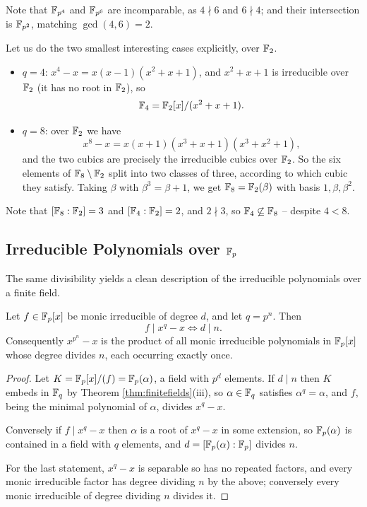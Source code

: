 \documentclass[a4paper]{scrartcl}
\begin{document}
Note that $\mathbb{F}_{p^4}$ and $\mathbb{F}_{p^6}$ are incomparable, as $4 \nmid 6$ and $6 \nmid 4$; and their intersection is $\mathbb{F}_{p^2}$, matching $\gcd(4,6) = 2$.

\begin{example}
	Let us do the two smallest interesting cases explicitly, over $\mathbb{F}_2$.
	\begin{itemize}
		\item $q = 4$: $x^4 - x = x(x-1)(x^2+x+1)$, and $x^2+x+1$ is irreducible over $\mathbb{F}_2$ (it has no root in $\mathbb{F}_2$), so
		$$\mathbb{F}_4 = \mathbb{F}_2[x]/(x^2+x+1).$$
		\item $q = 8$: over $\mathbb{F}_2$ we have
		$$x^8-x = x(x+1)(x^3+x+1)(x^3+x^2+1),$$
		and the two cubics are precisely the irreducible cubics over $\mathbb{F}_2$. So the six elements of $\mathbb{F}_8 \setminus \mathbb{F}_2$ split into two classes of three, according to which cubic they satisfy. Taking $\beta$ with $\beta^3 = \beta + 1$, we get $\mathbb{F}_8 = \mathbb{F}_2(\beta)$ with basis $1, \beta, \beta^2$.
	\end{itemize}
	Note that $[\mathbb{F}_8:\mathbb{F}_2] = 3$ and $[\mathbb{F}_4:\mathbb{F}_2] = 2$, and $2 \nmid 3$, so $\mathbb{F}_4 \not\subseteq \mathbb{F}_8$ -- despite $4 < 8$.
\end{example}

\subsection{Irreducible Polynomials over $\mathbb{F}_p$}

The same divisibility yields a clean description of the irreducible polynomials over a finite field.

\begin{proposition}\label{prop:irredfp}
	Let $f \in \mathbb{F}_p[x]$ be monic irreducible of degree $d$, and let $q = p^n$. Then
	$$f \mid x^q - x \iff d \mid n.$$
	Consequently $x^{p^n}-x$ is the product of all monic irreducible polynomials in $\mathbb{F}_p[x]$ whose degree divides $n$, each occurring exactly once.
\end{proposition}

\begin{proof}
	Let $K = \mathbb{F}_p[x]/(f) = \mathbb{F}_p(\alpha)$, a field with $p^d$ elements. If $d \mid n$ then $K$ embeds in $\mathbb{F}_q$ by Theorem \ref{thm:finitefields}(iii), so $\alpha \in \mathbb{F}_q$ satisfies $\alpha^q = \alpha$, and $f$, being the minimal polynomial of $\alpha$, divides $x^q-x$.

	Conversely if $f \mid x^q - x$ then $\alpha$ is a root of $x^q-x$ in some extension, so $\mathbb{F}_p(\alpha)$ is contained in a field with $q$ elements, and $d = [\mathbb{F}_p(\alpha):\mathbb{F}_p]$ divides $n$.

	For the last statement, $x^q-x$ is separable so has no repeated factors, and every monic irreducible factor has degree dividing $n$ by the above; conversely every monic irreducible of degree dividing $n$ divides it.
\end{proof}
\end{document}
